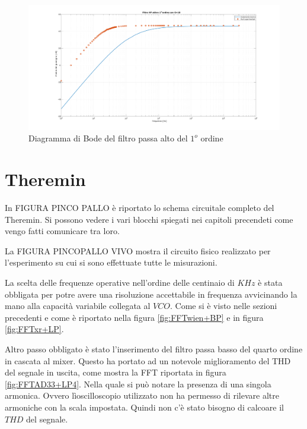 \documentclass[titlepage]{report}
\begin{document}
		\begin{figure}[H]
			\centering
			\includegraphics[scale=0.34]{Immagini/bode_hp1_ua741.pdf}
			\caption{Diagramma di Bode del filtro passa alto del $1^o$ ordine}
			\label{fig:BODEHp1Real}
		\end{figure}

\section{Theremin}
\label{ch:Teremin}
	In FIGURA PINCO PALLO è riportato lo schema circuitale completo del Theremin. Si possono vedere i vari blocchi spiegati nei capitoli precendeti come vengo fatti comunicare tra loro.

	La FIGURA PINCOPALLO VIVO mostra il circuito fisico realizzato per l'esperimento su cui si sono effettuate tutte le misurazioni.


	La scelta delle frequenze operative nell'ordine delle centinaio di $KHz$ è stata obbligata per potre avere una risoluzione accettabile in frequenza avvicinando la mano alla capacità variabile collegata al $VCO$.
	Come si è visto nelle sezioni precedenti e come è riportato nella figura \ref{fig:FFTwien+BP} e in figura \ref{fig:FFTxr+LP}.

	Altro passo obbligato è stato l'inserimento del filtro passa basso del quarto ordine in cascata al mixer. Questo ha portato ad un notevole miglioramento del THD del segnale in uscita, come mostra la FFT riportata in figura \ref{fig:FFTAD33+LP4}. Nella quale si può notare la presenza di una singola armonica. Ovvero lìoscilloscopio utilizzato non ha permesso di rilevare altre armoniche con la scala impostata. Quindi non c'è stato bisogno di calcoare il $THD$ del segnale.
	
\end{document}
